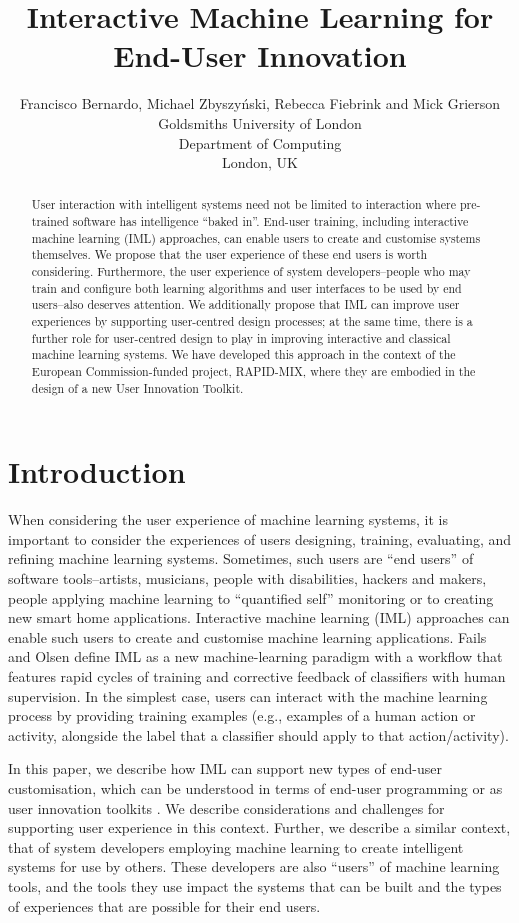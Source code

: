 \documentclass[letterpaper]{article}
\title{Interactive Machine Learning for End-User Innovation}
\author{Francisco Bernardo, Michael Zbyszy\'{n}ski, Rebecca Fiebrink and Mick Grierson\\
Goldsmiths University of London\\
Department of Computing\\
London, UK\\
}
\begin{document}
\maketitle

\begin{abstract}
User interaction with intelligent systems need not be limited to interaction where pre-trained software has intelligence ``baked in''. End-user training, including interactive machine learning (IML) approaches, can enable users to create and customise systems themselves. We propose that the user experience of these end users is worth considering. Furthermore, the user experience of system developers--people who may train and configure both learning algorithms and user interfaces to be used by end users--also deserves attention. We additionally propose that IML can improve user experiences by supporting user-centred design processes; at the same time, there is a further role for user-centred design to play in improving interactive and classical machine learning systems. We have developed this approach in the context of the European Commission-funded project, RAPID-MIX, where they are embodied in the design of a new User Innovation Toolkit.\end{abstract}

\section{Introduction}
When considering the user experience of machine learning systems, it is important to consider the experiences of users designing, training, evaluating, and refining machine learning systems. Sometimes, such users are ``end users'' of software tools--artists, musicians, people with disabilities, hackers and makers, people applying machine learning to ``quantified self'' monitoring or to creating new smart home applications. Interactive machine learning (IML) approaches can enable such users to create and customise machine learning applications. Fails and Olsen \citeyear{fails2003interactive} define IML as a new machine-learning paradigm with a workflow that features rapid cycles of training and corrective feedback of classifiers with human supervision. In the simplest case, users can interact with the machine learning process by providing training examples (e.g., examples of a human action or activity, alongside the label that a classifier should apply to that action/activity). 

In this paper, we describe how IML can support new types of end-user customisation, which can be understood in terms of end-user programming \cite{lieberman2006end} or as user innovation toolkits \cite{von2005democratizing}. We describe considerations and challenges for supporting user experience in this context. Further, we describe a similar context, that of system developers employing machine learning to create intelligent systems for use by others. These developers are also ``users'' of machine learning tools, and the tools they use impact the systems that can be built and the types of experiences that are possible for their end users. 
\end{document}
